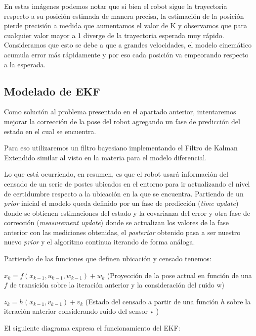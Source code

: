 

En estas imágenes podemos notar que si bien el robot sigue la trayectoria respecto a su posición estimada de manera precisa, la estimación de la posición pierde precisión a medida que aumentamos el valor de K y observamos que para cualquier valor mayor a 1 diverge de la trayectoria esperada muy rápido. Consideramos que esto se debe a que a grandes velocidades, el modelo cinemático acumula error más rápidamente y por eso cada posición va empeorando respecto a la esperada.

\subsection{Modelado de EKF}

Como solución al problema presentado en el apartado anterior, intentaremos mejorar la corrección de la pose del robot agregando un fase de predicción del estado en el cual se encuentra.

Para eso utilizaremos un filtro bayesiano implementando el Filtro de Kalman Extendido similar al visto en la materia para el modelo diferencial.

Lo que está ocurriendo, en resumen, es que el robot usará información del censado de un serie de postes ubicados en el entorno para ir actualizando el nivel de certidumbre respecto a la ubicación en la que se encuentra. Partiendo de un \textit{prior} inicial el modelo queda definido por un fase de predicción (\textit{time update}) donde se obtienen estimaciones del estado y la covarianza del error y otra fase de corrección (\textit{measurement update}) donde se actualizan los valores de la fase anterior con las mediciones obtenidas, el \textit{posterior} obtenido pasa a ser nuestro nuevo \textit{prior} y el algoritmo continua iterando de forma análoga.


Partiendo de las funciones que definen ubicación y censado tenemos:

$x_k = f(x_{k-1}, u_{k-1},w_{k-1}) + w_k$  (Proyección de la pose actual en función de una $f$ de transición sobre la iteración anterior y la consideración del ruido w)

$z_k = h(x_{k-1},v_{k-1}) + v_k$   (Estado del censado a partir de una función $h$ sobre la iteración anterior considerando ruido del sensor v )

El siguiente diagrama expresa el funcionamiento del EKF:


